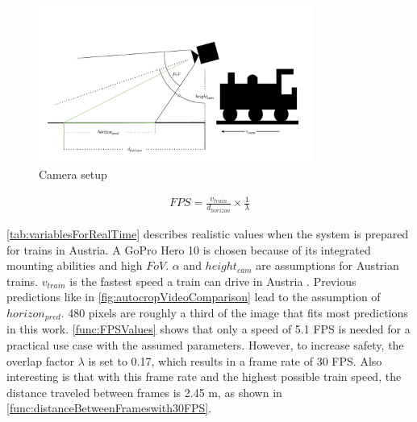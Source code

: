 \begin{figure}[H]
    \centering
    \includegraphics[width=0.8\textwidth]{PICs/discussion/Kameraaufbau.pdf}
    \caption{Camera setup}
    \label{fig:cameraSetup}
\end{figure}

\begin{align}
    FPS = \frac{v_{train}}{d_{horizon}} \times \frac{1}{\lambda}
    \label{func:RealTime}
\end{align}

\autoref{tab:variablesForRealTime} describes realistic values when the system is prepared for trains in Austria.
A GoPro Hero 10 \cite{goproHero10} is chosen because of its integrated mounting abilities and high $FoV$.
$\alpha$ and $height_{cam}$ are assumptions for Austrian trains.
$v_{train}$ is the fastest speed a train can drive in Austria \cite{geschwindigkeitZugAustria}.
Previous predictions like in \autoref{fig:autocropVideoComparison} lead to the assumption of $horizon_{pred}$.
480 pixels are roughly a third of the image that fits most predictions in this work.
\autoref{func:FPSValues} shows that only a speed of 5.1 \ac{FPS} is needed for a practical use case with the assumed parameters.
However, to increase safety, the overlap factor $\lambda$ is set to 0.17, which results in a frame rate of 30 \ac{FPS}.
Also interesting is that with this frame rate and the highest possible train speed, the distance traveled between frames is 2.45 m, as shown in \autoref{func:distanceBetweenFrameswith30FPS}.

